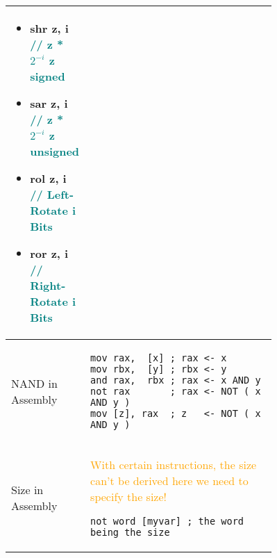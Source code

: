 \documentclass[main.tex,fontsize=8pt,paper=a4,paper=portrait,DIV=calc,]{scrartcl}
\begin{document}
\begin{table}[h!]
\begin{tabular}{|m{0,2\linewidth}|m{0.755\linewidth}|}
\begin{itemize}
\item shr z,   i  \textcolor{teal}{// z * \(2^{-i}\) z signed}
\item sar z,   i  \textcolor{teal}{// z * \(2^{-i}\) z unsigned }
\item rol z,   i  \textcolor{teal}{// Left-Rotate i Bits }
\item ror z,   i  \textcolor{teal}{// Right-Rotate i Bits }
\end{itemize}\\
\hline
NAND in Assembly & 
\begin{lstlisting}
mov rax,  [x] ; rax <- x
mov rbx,  [y] ; rbx <- y
and rax,  rbx ; rax <- x AND y
not rax       ; rax <- NOT ( x AND y )
mov [z], rax  ; z   <- NOT ( x AND y )
\end{lstlisting}\\
\hline
Size in Assembly & 
\textcolor{orange}{With certain instructions, the size can't be derived\newline
here we need to specify the size!}\newline
\begin{lstlisting}
not word [myvar] ; the word being the size
\end{lstlisting}\\
\hline
\end{tabular}
\end{table}
\pagebreak
\end{document}
